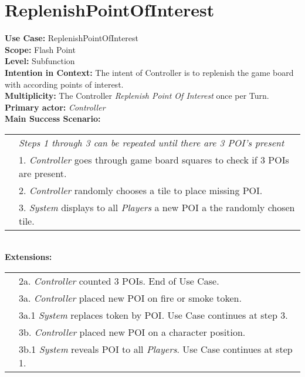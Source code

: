 \documentclass{article}
\begin{document}
	\section*{ReplenishPointOfInterest}
	\textbf{Use Case:} ReplenishPointOfInterest\\
	\textbf{Scope:} Flash Point\\
	\textbf{Level:} Subfunction\\
	\textbf{Intention in Context:} The intent of Controller is to replenish the game board with according points of interest.\\
	\textbf{Multiplicity:} The Controller \textit{Replenish Point Of Interest} once per Turn. \\
	\textbf{Primary actor:} \textit{Controller}\\
	\textbf{Main Success Scenario:}\\
	\begin{tabular}{l l}
		&\textit{Steps 1 through 3 can be repeated until there are 3 POI's present}\\
		&1. \textit{Controller} goes through game board squares to check if 3 POIs are present.\\
		&2. \textit{Controller} randomly chooses a tile to place missing POI.\\
		&3. \textit{System} displays to all \textit{Players} a new POI a the randomly chosen tile.
	\end{tabular}\\
	\textbf{Extensions:}\\
	\begin{tabular}{l l}
		&2a. \textit{Controller} counted 3 POIs. End of Use Case.\\
		&3a. \textit{Controller} placed new POI on fire or smoke token.\\
		&\qquad3a.1 \textit{System} replaces token by POI. Use Case continues at step 3.\\
		&3b. \textit{Controller} placed new POI on a character position.\\
		&\qquad3b.1 \textit{System} reveals POI to all \textit{Players}. Use Case continues at step 1.
	\end{tabular}
\end{document}
